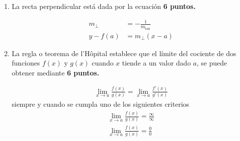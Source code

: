 \documentclass{article}
\begin{document}
\begin{enumerate}
\item La recta perpendicular está dada por la ecuación 
\hfill \textbf{6 puntos.}


\begin{align*}
m_{\perp} &= - \frac{1}{m_{\tan}} \\
y - f(a) &= m_{\perp} (x - a)
\end{align*}

\item La regla o teorema de l'H\^opital establece que el límite del cociente de
dos funciones $f(x)$ y $g(x)$ cuando $x$ tiende a un valor dado $a$, se puede 
obtener mediante 
\hfill \textbf{6 puntos.}


\begin{align*}
\lim_{x \rightarrow a} \frac{f(x)}{g(x)}= 
\lim_{x \rightarrow a}\frac{f'(x)}{g'(x)}     
\end{align*} 
siempre y cuando se cumpla uno de los siguientes criterios
\begin{align*}
\lim_{x \rightarrow a} \frac{f(x)}{g(x)}= \frac{\infty}{\infty} \\
\lim_{x \rightarrow a} \frac{f(x)}{g(x)}= \frac{0}{0}
\end{align*} 

\end{enumerate}

\end{document}
